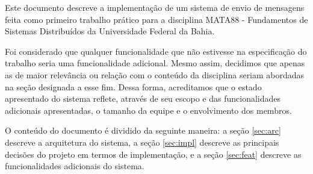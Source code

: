 \documentclass[../main.tex]{subfiles}
\begin{document}
Este documento descreve a implementação de um sistema de envio de mensagens feita como primeiro trabalho prático para a disciplina MATA88 - Fundamentos de Sistemas Distribuídos da Universidade Federal da Bahia.

Foi considerado que qualquer funcionalidade que não estivesse na especificação do trabalho seria uma funcionalidade adicional.
Mesmo assim, decidimos que apenas as de maior relevância ou relação com o conteúdo da disciplina seriam abordadas na seção designada a esse fim.
Dessa forma, acreditamos que o estado apresentado do sistema reflete, através de seu escopo e das funcionalidades adicionais apresentadas, o tamanho da equipe e o envolvimento dos membros.

O conteúdo do documento é dividido da seguinte maneira: a seção \ref{sec:arc} descreve a arquitetura do sistema, a seção \ref{sec:impl} descreve as principais decisões do projeto em termos de implementação, e a seção \ref{sec:feat} descreve as funcionalidades adicionais do sistema.
\end{document}
